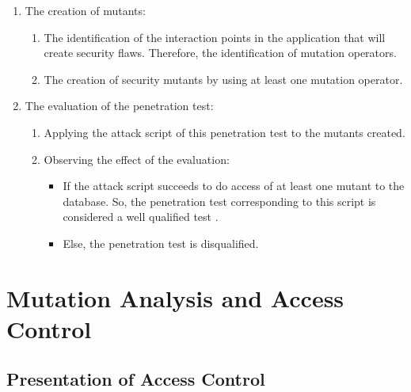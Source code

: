 \documentclass{acm_proc_article-sp}
\begin{document}
\begin{enumerate}
\item The creation of mutants:
\begin{enumerate}
\item The identification of the interaction points in the application that will create security flaws. Therefore, the identification of mutation operators.
\item The creation of security mutants by using at least one mutation operator.
\end{enumerate}
\item The evaluation of the penetration test:
\begin{enumerate}
\item Applying the attack script of this penetration test to the mutants created.
\item Observing the effect of the evaluation:
\begin{itemize}
\item If the attack script succeeds to do access of at least one mutant to the database. So, the penetration test corresponding to this script is considered a well qualified test .
\item Else, the penetration test is disqualified.
\end{itemize}
\end{enumerate}
\end{enumerate}

\section{Mutation Analysis and Access\\ Control}
\subsection{Presentation of Access Control}
\end{document}
